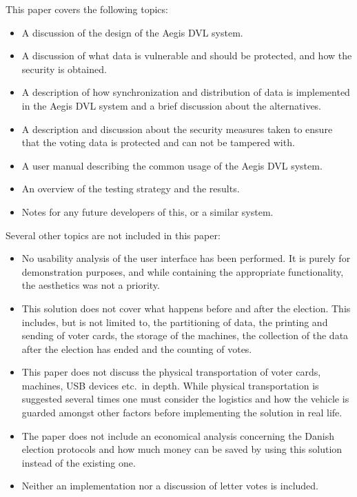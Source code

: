 \documentclass[a4paper]{report}
\begin{document}
This paper covers the following topics:
\begin{itemize}

\item A discussion of the design of the Aegis DVL system.

\item A discussion of what data is vulnerable and should be protected, and how the security is obtained.

\item A description of how synchronization and distribution of data is implemented in the Aegis DVL system and a brief discussion about the alternatives.

\item A description and discussion about the security measures taken to ensure that the voting data is protected and can not be tampered with. 

\item A user manual describing the common usage of the Aegis DVL system.

\item An overview of the testing strategy and the results.

\item Notes for any future developers of this, or a similar system. \\

\end{itemize}

Several other topics are not included in this paper:
\begin{itemize}

\item No usability analysis of the user interface has been performed. It is purely for demonstration purposes, and while containing the appropriate functionality, the aesthetics was not a priority.

\item This solution does not cover what happens before and after the election. This includes, but is not limited to, the partitioning of data, the printing and sending of voter cards, the storage of the machines, the collection of the data after the election has ended and the counting of votes.

\item This paper does not discuss the physical transportation of voter cards, machines, USB devices etc.\ in depth. While physical transportation is suggested several times one must consider the logistics and how the vehicle is guarded amongst other factors before implementing the solution in real life. 

\item The paper does not include an economical analysis concerning the Danish election protocols and how much money can be saved by using this solution instead of the existing one.

\item Neither an implementation nor a discussion of letter votes is included.
\end{itemize}
\end{document}
